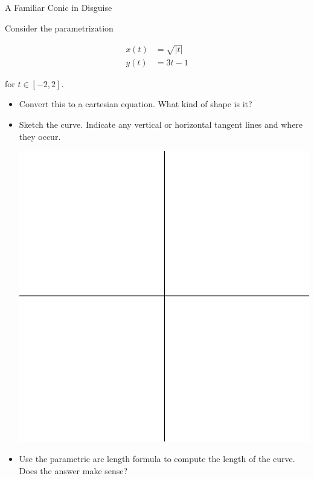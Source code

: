 \begin{exercise}{A Familiar Conic in Disguise \Coffeecup \Coffeecup \Coffeecup}

 Consider the parametrization 

\begin{align*}
 x(t)&=\sqrt{|t|} \\
 y(t)&=3t-1
\end{align*}

for $t\in [-2,2]$.
\begin{itemize}
\item Convert this to a cartesian equation.  What kind of shape is it?  

\vspace*{1in}

\item Sketch the curve.  Indicate any vertical or horizontal tangent lines and where they occur.

\begin{center}
\includegraphics[scale=0.8]{quadall}
\end{center}

\item Use the parametric arc length formula to compute the length of the curve.  Does the answer make sense?
\vspace*{3in}
\end{itemize}
\end{exercise}

